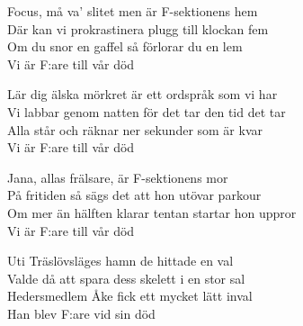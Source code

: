 \begin{vers}
Focus, må va' slitet men är F-sektionens hem \\
Där kan vi prokrastinera plugg till klockan fem\\
Om du snor en gaffel så förlorar du en lem \\
Vi är F:are till vår död\\
\end{vers}

\begin{vers}
Lär dig älska mörkret är ett ordspråk som vi har\\
Vi labbar genom natten för det tar den tid det tar\\
Alla står och räknar ner sekunder som är kvar\\
Vi är F:are till vår död
\end{vers}

\begin{vers}
Jana, allas frälsare, är F-sektionens mor\\
På fritiden så sägs det att hon utövar parkour\\
Om mer än hälften klarar tentan startar hon uppror\\
Vi är F:are till vår död \\
\end{vers}

\begin{vers}
Uti Träslövsläges hamn de hittade en val\\
Valde då att spara dess skelett i en stor sal\\
Hedersmedlem Åke fick ett mycket lätt inval\\
Han blev F:are vid sin död\\
\end{vers}

\fi

